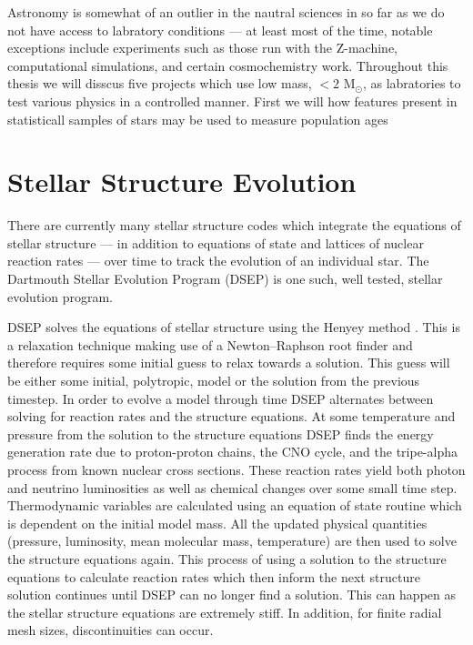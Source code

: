 Astronomy is somewhat of an outlier in the nautral sciences in so far as we do
not have access to labratory conditions --- at least most of the time, notable
exceptions include experiments such as those run with the Z-machine,
computational simulations, and certain cosmochemistry work. Throughout this
thesis we will disscus five projects which use low mass, $< 2$ M$_{\odot}$, as
labratories to test various physics in a controlled manner. First we will how
features present in statisticall samples of stars may be used to measure
population ages 

\chapter{Stellar Structure Evolution}
There are currently many stellar structure codes \citep[e.g.][]{Dotter2008,
Kovetz2009, Paxton2011} which integrate the equations of stellar structure ---
in addition to equations of state and lattices of nuclear reaction rates ---
over time to track the evolution of an individual star. The Dartmouth Stellar
Evolution Program (DSEP) \citep{Chaboyer2001, Bjork2006, Dotter2008} is one
such, well tested, stellar evolution program.

DSEP solves the equations of stellar structure using the Henyey method
\citep{Henyey1964}. This is a relaxation technique making use of a
Newton–Raphson root finder and therefore requires some initial guess to relax
towards a solution. This guess will be either some initial, polytropic, model
or the solution from the previous timestep.  In order to evolve a model through
time DSEP alternates between solving for reaction rates and the structure
equations. At some temperature and pressure from the solution to the structure
equations DSEP finds the energy generation rate due to proton-proton chains,
the CNO cycle, and the tripe-alpha process from known nuclear cross sections.
These reaction rates yield both photon and neutrino luminosities as well as
chemical changes over some small time step. Thermodynamic variables are
calculated using an equation of state routine which is dependent on the initial
model mass. All the updated physical quantities (pressure, luminosity, mean
molecular mass, temperature) are then used to solve the structure equations
again. This process of using a solution to the structure equations to calculate
reaction rates which then inform the next structure solution continues until
DSEP can no longer find a solution.  This can happen as the stellar structure
equations are extremely stiff. In addition, for finite radial mesh sizes,
discontinuities can occur.

